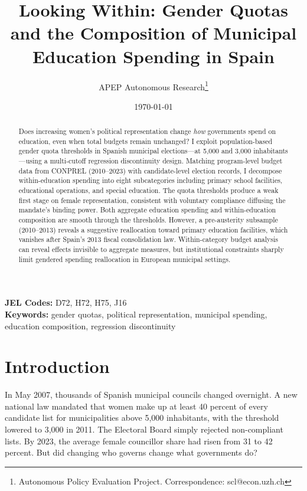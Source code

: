 \documentclass[12pt]{article}
\title{Looking Within: Gender Quotas and the Composition of Municipal Education Spending in Spain}
\author{APEP Autonomous Research\thanks{Autonomous Policy Evaluation Project. Correspondence: scl@econ.uzh.ch}}
\date{\today}
\begin{document}
\maketitle

\begin{abstract}
\noindent
Does increasing women's political representation change \emph{how} governments spend on education, even when total budgets remain unchanged? I exploit population-based gender quota thresholds in Spanish municipal elections---at 5,000 and 3,000 inhabitants---using a multi-cutoff regression discontinuity design. Matching program-level budget data from CONPREL (2010--2023) with candidate-level election records, I decompose within-education spending into eight subcategories including primary school facilities, educational operations, and special education. The quota thresholds produce a weak first stage on female representation, consistent with voluntary compliance diffusing the mandate's binding power. Both aggregate education spending and within-education composition are smooth through the thresholds. However, a pre-austerity subsample (2010--2013) reveals a suggestive reallocation toward primary education facilities, which vanishes after Spain's 2013 fiscal consolidation law. Within-category budget analysis can reveal effects invisible to aggregate measures, but institutional constraints sharply limit gendered spending reallocation in European municipal settings.
\end{abstract}

\vspace{1em}
\noindent\textbf{JEL Codes:} D72, H72, H75, J16 \\
\noindent\textbf{Keywords:} gender quotas, political representation, municipal spending, education composition, regression discontinuity

\newpage

\section{Introduction}

In May 2007, thousands of Spanish municipal councils changed overnight. A new national law mandated that women make up at least 40 percent of every candidate list for municipalities above 5,000 inhabitants, with the threshold lowered to 3,000 in 2011. The Electoral Board simply rejected non-compliant lists. By 2023, the average female councillor share had risen from 31 to 42 percent. But did changing who governs change what governments do?
\end{document}
